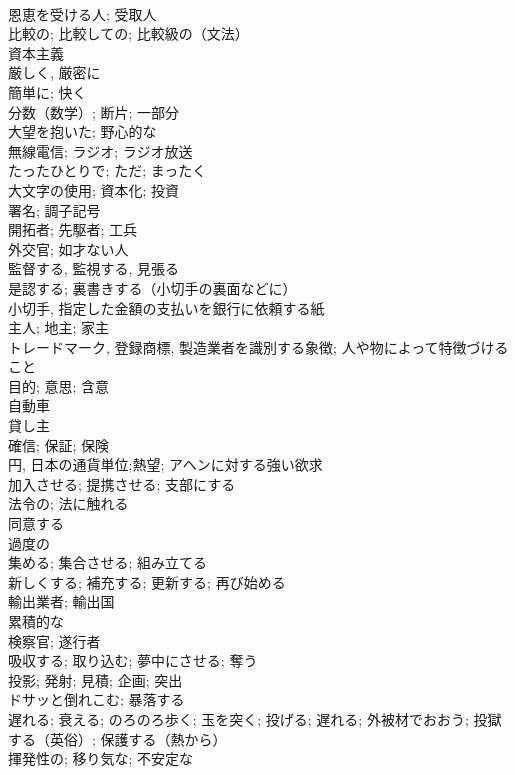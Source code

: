 \documentclass[8pt]{extreport}
\begin{document}
\begin{CJK}{UTF8}{min}
\\	恩恵を受ける人; 受取人	
\\	比較の; 比較しての; 比較級の（文法）	
\\	資本主義	
\\	厳しく, 厳密に	
\\	簡単に; 快く	
\\	分数（数学）; 断片; 一部分	
\\	大望を抱いた; 野心的な	
\\	無線電信; ラジオ; ラジオ放送	
\\	たったひとりで; ただ; まったく	
\\	大文字の使用; 資本化; 投資	
\\	署名; 調子記号	
\\	開拓者; 先駆者; 工兵	
\\	外交官; 如才ない人	
\\	監督する, 監視する, 見張る	
\\	是認する; 裏書きする（小切手の裏面などに）	
\\	小切手, 指定した金額の支払いを銀行に依頼する紙	
\\	主人; 地主; 家主	
\\	トレードマーク, 登録商標, 製造業者を識別する象徴; 人や物によって特徴づけること	
\\	目的; 意思; 含意	
\\	自動車	
\\	貸し主	
\\	確信; 保証; 保険	
\\	円, 日本の通貨単位;熱望; アヘンに対する強い欲求	
\\	加入させる; 提携させる; 支部にする	
\\	法令の; 法に触れる	
\\	同意する	
\\	過度の	
\\	集める; 集合させる; 組み立てる	
\\	新しくする; 補充する; 更新する; 再び始める	
\\	輸出業者; 輸出国	
\\	累積的な	
\\	検察官; 遂行者	
\\	吸収する; 取り込む; 夢中にさせる; 奪う	
\\	投影; 発射; 見積; 企画; 突出	
\\	ドサッと倒れこむ; 暴落する	
\\	遅れる; 衰える; のろのろ歩く; 玉を突く; 投げる; 遅れる; 外被材でおおう; 投獄する（英俗）; 保護する（熱から）	
\\	揮発性の; 移り気な; 不安定な	

\end{CJK}
\end{document}
